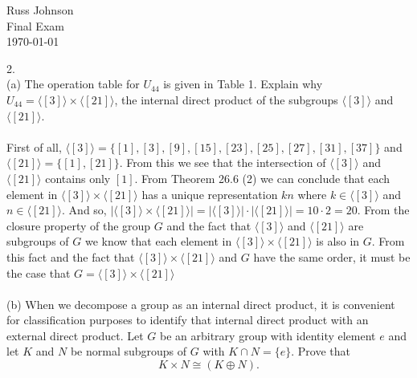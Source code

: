 \documentclass[11pt]{article}
\begin{document}
\begin{flushright}
Russ Johnson\\
Final Exam\\
\today\\
\end{flushright}

2.\\
(a) The operation table for $U_{44}$ is given in Table 1. Explain why $U_44=\langle [3] \rangle \times \langle [21] \rangle$, the internal direct product of the subgroups $\langle [3] \rangle$ and $\langle [21] \rangle$.\\
~\\
First of all, $\langle [3] \rangle = \{[1],[3],[9],[15],[23],[25],[27],[31],[37]\}$ and $\langle [21] \rangle = \{[1],[21]\}$. 
From this we see that the intersection of $\langle [3] \rangle$ and $\langle [21] \rangle$ contains only $[1]$. 
From Theorem 26.6 (2) we can conclude that each element in $\langle [3] \rangle \times \langle [21] \rangle$ has a unique representation $kn$ 
where $k\in \langle [3] \rangle$ and $n\in \langle [21] \rangle$. And so, 
$ |\langle [3] \rangle \times \langle [21] \rangle| = |\langle [3] \rangle|\cdot |\langle [21] \rangle | = 10\cdot 2 = 20. $ 
From the closure property of the group $G$ and the fact that $\langle [3] \rangle $ and $ \langle [21] \rangle$ are subgroups of $G$ we know that each element in $ \langle [3] \rangle \times \langle [21] \rangle $ is also in $G$. From this fact and the fact that $ \langle [3] \rangle \times \langle [21] \rangle $ and $G$ have the same order, it must be the case that $ G= \langle [3] \rangle \times \langle [21] \rangle $\\
~\\
(b) When we decompose a group as an internal direct product, it is convenient for classification purposes to identify that internal direct product with an external direct product. Let $G$ be an arbitrary group with identity element $e$ and let $K$ and $N$ be normal subgroups of $G$ with $K \cap N = \{e\}$. Prove that 
\[ K \times N \cong (K \oplus N).\]\\
~\\
\newcommand{\dom}{\ensuremath{K \oplus N}}
\newcommand{\img}{\ensuremath{K \times N}}
\end{document}
